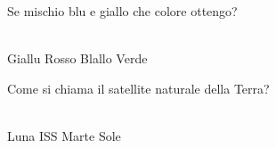 \documentclass[a4paper,11pt]{exam}
\begin{document}
\begin{questions}
    
\question Se mischio blu e giallo che colore ottengo?\\\
\begin{oneparchoices}
  \choice Giallu
  \choice Rosso
  \choice Blallo
  \choice Verde
\end{oneparchoices}

    
\question Come si chiama il satellite naturale della Terra?\\\
\begin{oneparchoices}
  \choice Luna
  \choice ISS
  \choice Marte
  \choice Sole
\end{oneparchoices}

    
\end{questions}

    
    \newpage
    
    
\end{document}
